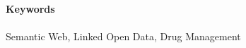 \documentclass[%
  parskip=half,
  ]{scrreprt} %
\title{%
\dipltitle\\%
\bigskip\usekomafont{subtitle}%
\parbox[h]{0.8\textwidth}{\begin{center}\diplsubtitle\end{center}}%
}
\subtitle{\usekomafont{subject}\vspace{3em}\diplsubject}
\author{}
\date{}
\newcommand{\rem}[1]{\textcolor{remcolor}{\emph{#1}}}
\newcommand{\todo}[1]{\marginline{\footnotesize TODO: #1}}
\begin{document}

\ifpdf
{}
\else
{}
\fi


\maketitle




\paragraph{Keywords} Semantic Web, Linked Open Data, Drug Management


\setcounter{tocdepth}{1}
\tableofcontents

\clearpage














\appendix




%
\end{document}
